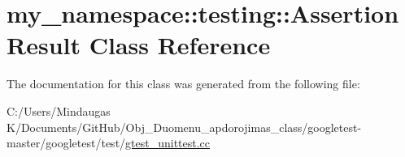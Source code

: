 \hypertarget{classmy__namespace_1_1testing_1_1_assertion_result}{}\section{my\+\_\+namespace\+::testing\+::Assertion\+Result Class Reference}
\label{classmy__namespace_1_1testing_1_1_assertion_result}


The documentation for this class was generated from the following file\+:\begin{DoxyCompactItemize}
\item 
C\+:/\+Users/\+Mindaugas K/\+Documents/\+Git\+Hub/\+Obj\+\_\+\+Duomenu\+\_\+apdorojimas\+\_\+class/googletest-\/master/googletest/test/\mbox{\hyperlink{googletest-master_2googletest_2test_2gtest__unittest_8cc}{gtest\+\_\+unittest.\+cc}}\end{DoxyCompactItemize}
